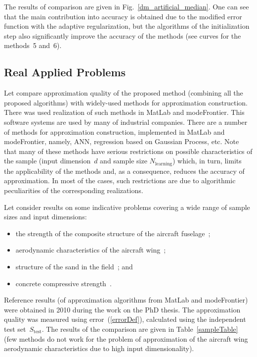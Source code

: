 \begin{multicols}{2}
{ }



The results of comparison are given in 
Fig.~\ref{dm_artificial_median}.
One can see that the main contribution into accuracy is obtained 
due to the modified error function with the adaptive regularization, 
but the algorithms of the initialization step 
also significantly improve the accuracy of the methods (see curves for 
the methods~5 and~6).

\subsection{Real Applied Problems}

\noindent
Let compare approximation quality of the proposed method (combining 
all the proposed algorithms)
with widely-used methods for approximation construction.
There was used realization of such methods in MatLab and modeFrontier.
This software systems are used by many of industrial companies.
There are a number of methods for approximation construction, implemented in MatLab and 
modeFrontier,
namely, ANN, regression based on Gaussian Process, etc.
Note that many of these methods have serious 
restrictions on possible characteristics of the sample (input dimension~$d$ and sample 
size $N_{\mathrm{learning}}$) which, in turn, limits the applicability of the methods and,
as a consequence, reduces the accuracy of approximation. In most of the cases, such 
restrictions are due to algorithmic peculiarities of the corresponding realizations.
{

}

Let consider results on some indicative problems covering a wide range 
of sample sizes and input dimensions:
\begin{itemize}
  \item the strength of the composite structure of the aircraft fuselage~\cite{copti};
  \item aerodynamic characteristics of the aircraft wing~\cite{quadpal};
  \item structure of the sand in the field~\cite{icfault}; and
  \item concrete compressive strength~\cite{concrete}.
\end{itemize}
Reference results (of approximation algorithms from MatLab and modeFrontier)
were obtained in 2010 during the work on the PhD thesis.
The approximation quality was measured using error~(\ref{errorDef}), 
calculated using the independent test set~$S_{\mathrm{test}}$.
The results of the comparison are given in Table~\ref{sampleTable} 
  (few methods do not work for the problem of approximation of the aircraft
  wing aerodynamic characteristics due to high input dimensionality).
  {
  
}
\end{multicols}
